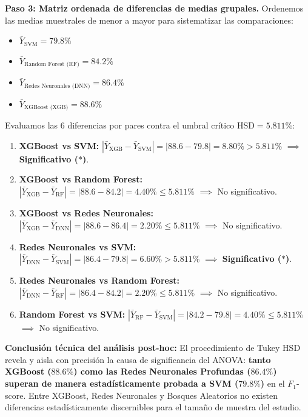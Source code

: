 \begin{solproblema}
	\textbf{Paso 3: Matriz ordenada de diferencias de medias grupales.}
	Ordenemos las medias muestrales de menor a mayor para sistematizar las comparaciones:
	\begin{itemize}
		\item $\bar{Y}_{\text{SVM}} = 79.8\%$
		\item $\bar{Y}_{\text{Random Forest (RF)}} = 84.2\%$
		\item $\bar{Y}_{\text{Redes Neuronales (DNN)}} = 86.4\%$
		\item $\bar{Y}_{\text{XGBoost (XGB)}} = 88.6\%$
	\end{itemize}
	Evaluamos las 6 diferencias por pares contra el umbral crítico $\text{HSD} = 5.811\%$:
	\begin{enumerate}
		\item \textbf{XGBoost vs SVM:} $|\bar{Y}_{\text{XGB}} - \bar{Y}_{\text{SVM}}| = |88.6 - 79.8| = 8.80\% > 5.811\%$ $\implies$ \textbf{Significativo ($*$)}.
		\item \textbf{XGBoost vs Random Forest:} $|\bar{Y}_{\text{XGB}} - \bar{Y}_{\text{RF}}| = |88.6 - 84.2| = 4.40\% \leq 5.811\%$ $\implies$ No significativo.
		\item \textbf{XGBoost vs Redes Neuronales:} $|\bar{Y}_{\text{XGB}} - \bar{Y}_{\text{DNN}}| = |88.6 - 86.4| = 2.20\% \leq 5.811\%$ $\implies$ No significativo.
		\item \textbf{Redes Neuronales vs SVM:} $|\bar{Y}_{\text{DNN}} - \bar{Y}_{\text{SVM}}| = |86.4 - 79.8| = 6.60\% > 5.811\%$ $\implies$ \textbf{Significativo ($*$)}.
		\item \textbf{Redes Neuronales vs Random Forest:} $|\bar{Y}_{\text{DNN}} - \bar{Y}_{\text{RF}}| = |86.4 - 84.2| = 2.20\% \leq 5.811\%$ $\implies$ No significativo.
		\item \textbf{Random Forest vs SVM:} $|\bar{Y}_{\text{RF}} - \bar{Y}_{\text{SVM}}| = |84.2 - 79.8| = 4.40\% \leq 5.811\%$ $\implies$ No significativo.
	\end{enumerate}
	\textbf{Conclusión técnica del análisis post-hoc:} El procedimiento de Tukey HSD revela y aisla con precisión la causa de significancia del ANOVA: \textbf{tanto XGBoost ($88.6\%$) como las Redes Neuronales Profundas ($86.4\%$) superan de manera estadísticamente probada a SVM ($79.8\%$)} en el $F_1$-score. Entre XGBoost, Redes Neuronales y Bosques Aleatorios no existen diferencias estadísticamente discernibles para el tamaño de muestra del estudio.
\end{solproblema}

